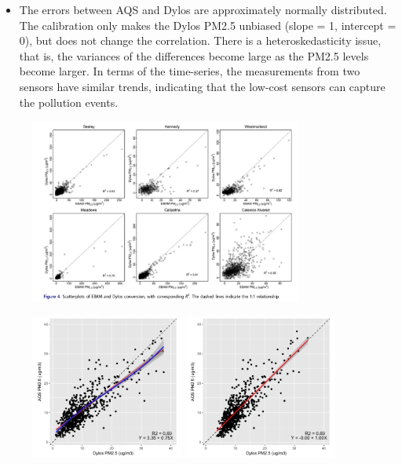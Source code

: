 \documentclass{article}
\begin{document}
\begin{itemize}
{\begin{itemize}
            \item The errors between AQS and Dylos are approximately normally distributed. The calibration only makes the Dylos PM2.5 unbiased (slope = 1, intercept = 0), but does not change the correlation. There is a heteroskedasticity issue, that is, the variances of the differences become large as the PM2.5 levels become larger. In terms of the time-series, the measurements from two sensors have similar trends, indicating that the low-cost sensors can capture the pollution events.
        \end{itemize}
        \begin{figure}[H]
            \centering
            \includegraphics[width=0.8\textwidth]{img/dylos.png}
            \caption{\citet{carvlin2017development}}
            \label{fig:dylos}
        \end{figure}
        \begin{figure}[H]
            \centering
            \includegraphics[width=0.45\textwidth]{img/aqs_dylos/scatter_reg.jpg} \qquad
            \includegraphics[width=0.45\textwidth]{img/aqs_dylos/scatter_adj.jpg}

\end{figure}}
\end{itemize}
\end{document}
